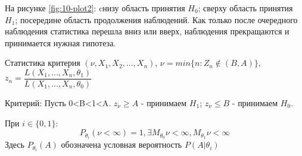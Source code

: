 На рисунке \ref{fig:10-plot2}:
cнизу область принятия $H_0$;
сверху область принятия $H_1$;
посередине область продолжения наблюдений.
Как только после очередного наблюдения статистика перешла вниз или вверх, наблюдения прекращаются и принимается нужная гипотеза.

Статистика критерия $(\nu, X_1, X_2, \dots, X_n)$,
$\nu = min \{ n : Z_n \notin (B, A) \}$,
$z_n = \dfrac{L(X_1, \dots, X_n, \theta_1)}{L(X_1, \dots, X_n, \theta_0)}$

Критерий: Пусть 0<B<1<A.
$z_\nu \geqslant A$ - принимаем $H_1$; $z_\nu \leqslant B$ - принимаем $H_0$.

\begin{theorem}
  При $i \in \{ 0, 1 \}$:
  \[
    P_{\theta_i}(\nu < \infty) = 1, \exists M_{\theta_0} \nu < \infty, M_{\theta_1} \nu < \infty
  \]
  Здесь $P_{\theta_i} (A)$ обозначена условная вероятность $P(A | \theta_i)$
\end{theorem}

